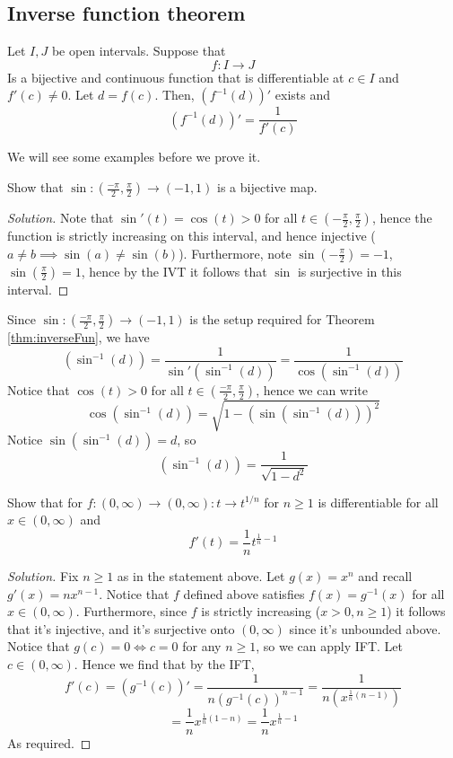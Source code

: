 \subsection{Inverse function theorem}
\begin{theorem}
  Let $I,J$ be open intervals. Suppose that 
  \[f:I\to J\]
  Is a bijective and continuous function that is differentiable at $c\in I$ and $f'(c)\neq
  0$. Let $d=f(c)$. Then, $(f^{-1}(d))'$ exists and
  \[(f^{-1}(d))'= \frac{1}{f'(c)}\]
  \label{thm:inverseFun}
\end{theorem}
We will see some examples before we prove it.

\begin{exercise}
  Show that $\sin:(\frac{-\pi}{2}, \frac{\pi}{2})\to (-1,1)$ is a bijective map.
\end{exercise}
\begin{proof}[Solution]
  Note that $\sin'(t)=\cos(t)>0$ for all $t\in(-\frac{\pi}{2},\frac{\pi}{2})$, hence the
  function is strictly increasing on this interval, and hence injective ($a\neq b \implies
  \sin(a)\neq \sin(b)$). Furthermore, note $\sin(-\frac{\pi}{2})=-1$,
  $\sin(\frac{\pi}{2})=1$, hence by the IVT it follows that $\sin$ is surjective in this
  interval.
\end{proof}

\begin{example}
  Since $\sin:(\frac{-\pi}{2}, \frac{\pi}{2})\to (-1,1)$ is the setup required for Theorem
  \ref{thm:inverseFun}, we have 
  \[(\sin^{-1}(d))= \frac{1}{\sin'(\sin^{-1}(d))}=\frac{1}{\cos(\sin^{-1}(d))}\]
  Notice that $\cos(t)>0$ for all $t\in(\frac{-\pi}{2}, \frac{\pi}{2})$, hence we can
  write 
  \[\cos(\sin^{-1}(d))=\sqrt{1-(\sin(\sin^{-1}(d)))^2}\]
  Notice $\sin(\sin^{-1}(d))=d$, so 
  \[(\sin^{-1}(d))= \frac{1}{\sqrt{1-d^2}}\]
\end{example}

\begin{exercise}
  Show that for $f:(0,\infty)\to(0,\infty):t\to t^{1/n}$ for $n\geq 1$ is differentiable
  for all $x\in(0,\infty)$ and 
  \[f'(t)=\frac{1}{n}t^{\frac{1}{n}-1}\]
\end{exercise}
\begin{proof}[Solution]
  Fix $n\geq 1$ as in the statement above. Let $g(x)=x^n$ and recall $g'(x)=nx^{n-1}$.
  Notice that $f$ defined above satisfies $f(x)=g^{-1}(x)$ for all $x\in(0,\infty)$.
  Furthermore, since $f$ is strictly increasing ($x>0,n\geq 1$) it follows that it's
  injective, and it's surjective onto $(0,\infty)$ since it's unbounded above. Notice that
  $g(c)=0 \iff c=0$ for any $n\geq 1$, so we can apply IFT. Let $c\in(0,\infty)$. Hence we
  find that by the IFT,
  \[f'(c)=(g^{-1}(c))'=\frac{1}{n(g^{-1}(c))^{n-1}}= \frac{1}{n(x^{\frac{1}{n}(n-1)})}\]
  \[=\frac{1}{n} x^{\frac{1}{n}(1-n)}= \frac{1}{n}x^{\frac{1}{n}-1}\]
  As required.  
\end{proof}


